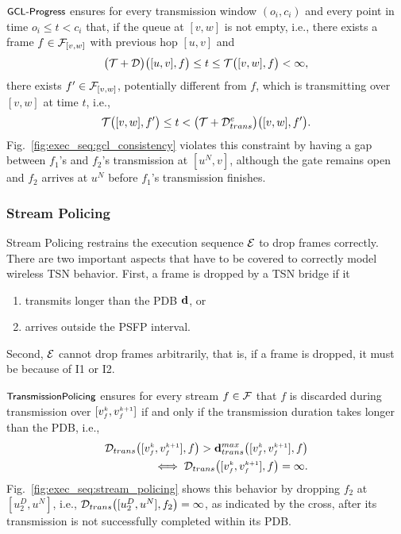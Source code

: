\textbf{$\GCLS$}\label{sec:execution_sequence:gcl:soundness}
ensures for every transmission window $(o_i, c_i)$ and every point in time $o_i \leq t < c_i$ that, if the queue at $[v,w]$ is not empty, i.e., there exists a frame $f \in \TT_{[v,w]}$ with previous hop $[u,v]$ and
\begin{equation*}
  \add{\T}{\D}{[u,v], f} \leq t \leq \T{[v,w], f} < \infty, 
\end{equation*}
there exists $f' \in \TT_{[v,w]}$, potentially different from $f$, which is transmitting over $[v,w]$ at time $t$, i.e.,
\begin{equation*}
  \T{[v,w], f'} \leq t < \add{\T}{\eDtrans}{[v,w], f'}. 
\end{equation*}
Fig.~\ref{fig:exec_seq:gcl_consistency} violates this constraint by having a gap between $f_1$'s and $f_2$'s transmission at $[u^N, v]$, although the gate remains open and $f_2$ arrives at $u^N$ before $f_1$'s transmission finishes.

\subsubsection{Stream Policing} \label{sec:execution_sequences:stream_policing}
Stream Policing restrains the execution sequence $\E$ to drop frames correctly. 
There are two important aspects that have to be covered to correctly model wireless TSN behavior.
First, a frame is dropped by a TSN bridge if it
\begin{enumerate}[label=I\arabic*)]
  \item transmits longer than the PDB $\dpdb{}$, or
    \item arrives outside the PSFP interval.
\end{enumerate}
Second, $\E$ cannot drop frames arbitrarily, that is, if a frame is dropped, it must be because of I1 or I2.

\textbf{$\TP$}
ensures for every stream $f \in \TT$ that $f$ is discarded during transmission over $[\v{k}{f}, \v{k+1}{f}]$ if and only if the transmission duration takes longer than the PDB, i.e.,
\begin{align*}
  \Dtrans{[\v{k}{f}, \v{k+1}{f}],f} > \dpdbtransmax{[\v{k}{f}, \v{k+1}{f}],f} \\
    \iff \Dtrans{\clink{k}{f},f} = \infty.
\end{align*}
Fig.~\ref{fig:exec_seq:stream_policing} shows this behavior by dropping $f_2$ at $[u_2^D, u^N]$, i.e., $\Dtrans{[u_2^D, u^N], f_2} = \infty$, as indicated by the cross, after its transmission is not successfully completed within its PDB.

